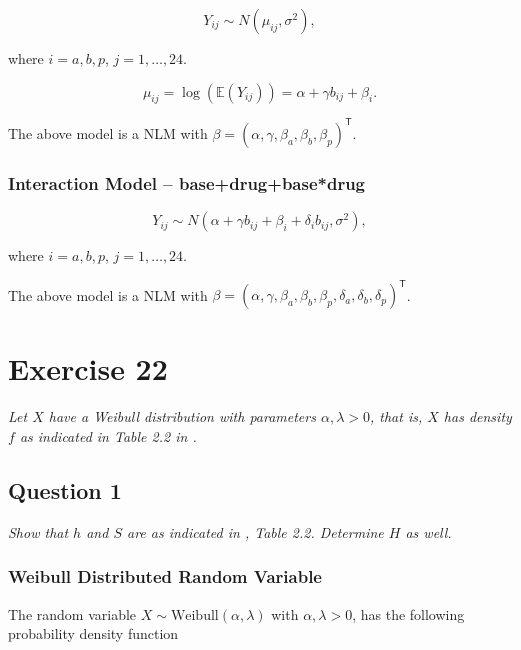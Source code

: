 \documentclass[a4paper,oneside]{memoir}
\begin{document}
\[Y_{ij}\sim N\left(\mu_{ij}, \sigma^2\right),\]

where \(i=a,b,p\), \(j=1,\dots,24\).

\[\mu_{ij}=\log(\mathbb{E}(Y_{ij}))=\alpha + \gamma b_{ij} + \beta_{i}.\]

The above model is a NLM with \(\beta=\left(\alpha, \gamma, \beta_{a}, \beta_b, \beta_p \right)^\textsf{T}\).

\hypertarget{interaction-model-basedrugbasedrug}{%
\subsection{Interaction Model -- base+drug+base*drug}\label{interaction-model-basedrugbasedrug}}

\[Y_{ij}\sim N\left(\alpha + \gamma b_{ij} + \beta_{i} + \delta_i b_{ij}, \sigma^2\right),\]

where \(i=a,b,p\), \(j=1,\dots,24\).

The above model is a NLM with \(\beta=\left(\alpha, \gamma, \beta_{a}, \beta_b, \beta_p, \delta_a, \delta_b, \delta_p \right)^\textsf{T}\).

\newpage

\hypertarget{exercise-22}{%
\chapter{Exercise 22}\label{exercise-22}}

\emph{Let \(X\) have a Weibull distribution with parameters \(\alpha, \lambda > 0\), that is, \(X\) has density \(f\) as indicated in Table 2.2 in \citet{Klein2003}.}

\hypertarget{question-1}{%
\section{Question 1}\label{question-1}}

\emph{Show that \(h\) and \(S\) are as indicated in \citet{Klein2003}, Table 2.2. Determine \(H\) as well.}

\hypertarget{weibull-distributed-random-variable}{%
\subsection{Weibull Distributed Random Variable}\label{weibull-distributed-random-variable}}

The random variable \(X \sim \text{Weibull}(\alpha, \lambda)\) with \(\alpha, \lambda > 0\), has the following probability density function
\end{document}
